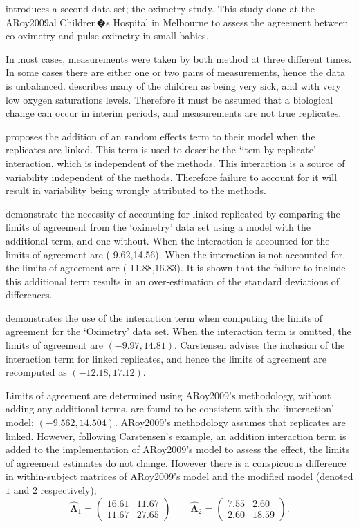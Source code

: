 \documentclass[12pt, a4paper]{report}
\theoremstyle{plain}
\theoremstyle{definition}
\theoremstyle{remark}
\begin{document}
	\citet{BXC2008} introduces a second data set; the oximetry study. This study done at the ARoy2009al Children�s Hospital in
	Melbourne to assess the agreement between co-oximetry and pulse oximetry in small babies.
	
	In most cases, measurements were taken by both method at three different times. In some cases there are either one or two pairs of measurements, hence the data is unbalanced. \citet{BXC2008} describes many of the children as being very sick, and with very low oxygen saturations levels. Therefore it must be assumed that a biological change can occur in interim periods, and measurements are not true replicates.
	
	\citet{BXC2008} proposes the addition of an random effects term to their model when the replicates are linked. This term is used to describe the `item by replicate' interaction, which is independent of the methods. This interaction is a source of variability independent of the methods. Therefore failure to account for it will result in variability being wrongly attributed to the methods.
	
	
	\citet{BXC2008} demonstrate the necessity of accounting for linked replicated by comparing the limits of agreement from the `oximetry' data set using a model with the additional term, and one without. When the interaction is accounted for the limits of agreement are (-9.62,14.56). When the interaction is not accounted for, the limits of agreement are (-11.88,16.83). It is shown that the failure to include this additional term results in an over-estimation of the standard deviations of differences.
	
	
	\citet{BXC2008} demonstrates the use of the interaction term when computing the limits of agreement for the `Oximetry' data set. When the interaction term is omitted, the limits of agreement are $(-9.97, 14.81)$. Carstensen advises the inclusion of the interaction term for linked replicates, and hence the limits of agreement are recomputed as $(-12.18,17.12)$.
	
	
	Limits of agreement are determined using ARoy2009's methodology, without adding any additional terms, are found to be consistent with the `interaction' model; $(-9.562, 14.504 )$. ARoy2009's methodology assumes that replicates are linked. However, following Carstensen's example, an addition interaction term is added to the implementation of ARoy2009's model to assess the effect, the limits of agreement estimates do not change. However there is a conspicuous difference in within-subject matrices of ARoy2009's model and the modified model (denoted $1$ and $2$ respectively);
	\begin{equation}
	\hat{\boldsymbol{\Lambda}}_{1}= \left(\begin{array}{cc}
	16.61 &	11.67\\
	11.67 & 27.65 \end{array}\right) \qquad
	\boldsymbol{\hat{\Lambda}}_{2}= \left( \begin{array}{cc}
	7.55 & 2.60 \\
	2.60 & 18.59 \end{array} \right).
	\end{equation}
	
\end{document}
